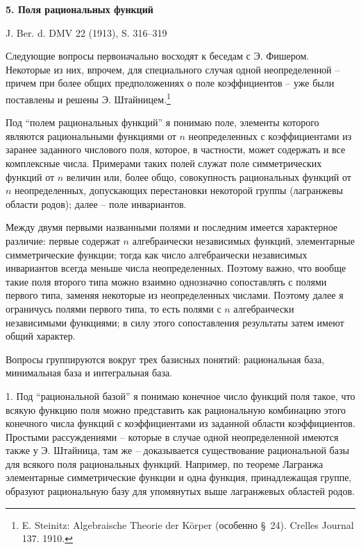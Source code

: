 \documentclass[11pt]{article}
\begin{document}
\begin{center}
{\Large\bfseries 5. Поля рациональных функций}\par
\vspace{1.2em}
J. Ber. d. DMV 22 (1913), S. 316--319
\end{center}

\vspace{2em}

Следующие вопросы первоначально восходят к беседам с Э. Фишером. Некоторые из них, впрочем, для специального случая одной неопределенной -- причем при более общих предположениях о поле коэффициентов -- уже были поставлены и решены Э. Штайницем.\footnote{E. Steinitz: Algebraische Theorie der Körper (особенно \S\ 24). Crelles Journal 137. 1910.}

Под ``полем рациональных функций'' я понимаю поле, элементы которого являются рациональными функциями от $n$ неопределенных с коэффициентами из заранее заданного числового поля, которое, в частности, может содержать и все комплексные числа. Примерами таких полей служат поле симметрических функций от $n$ величин или, более общо, совокупность рациональных функций от $n$ неопределенных, допускающих перестановки некоторой группы (лагранжевы области родов); далее -- поле инвариантов.

Между двумя первыми названными полями и последним имеется характерное различие: первые содержат $n$ алгебраически независимых функций, элементарные симметрические функции; тогда как число алгебраически независимых инвариантов всегда меньше числа неопределенных. Поэтому важно, что вообще такие поля второго типа можно взаимно однозначно сопоставлять с полями первого типа, заменяя некоторые из неопределенных числами. Поэтому далее я ограничусь полями первого типа, то есть полями с $n$ алгебраически независимыми функциями; в силу этого сопоставления результаты затем имеют общий характер.

Вопросы группируются вокруг трех базисных понятий: рациональная база, минимальная база и интегральная база.

1. Под ``рациональной базой'' я понимаю конечное число функций поля такое, что всякую функцию поля можно представить как рациональную комбинацию этого конечного числа функций с коэффициентами из заданной области коэффициентов. Простыми рассуждениями -- которые в случае одной неопределенной имеются также у Э. Штайница, там же -- доказывается существование рациональной базы для всякого поля рациональных функций. Например, по теореме Лагранжа элементарные симметрические функции и одна функция, принадлежащая группе, образуют рациональную базу для упомянутых выше лагранжевых областей родов.
\end{document}
